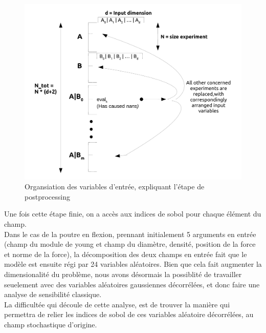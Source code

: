 \documentclass[a4paper,10pt]{article}
\begin{document}
\begin{figure}[H]
   \centering   
   \includegraphics[scale=0.175]{schema_postprocessing.png}
      \caption{Organsiation des variables d'entrée, expliquant l'étape de postprocessing}
         \label{posprocessing}
\end{figure}


Une fois cette étape finie, on a accès aux indices de sobol pour chaque élément du champ. \\
Dans le cas de la poutre en flexion, prennant initialement 5 arguments en entrée (champ du module de young et champ du diamètre, densité, position de la force et norme de la force), la décomposition des deux champs en entrée fait que le modèle est ensuite régi par 24 variables aléatoires. Bien que cela fait augmenter la dimensionalité du problème, nous avons désormais la possiblité de travailler seuelement avec des variables aléatoires gaussiennes décorrélées, et donc faire une analyse de sensibilité classique.\\
La difficultée qui découle de cette analyse, est de trouver la manière qui permettra de relier les indices de sobol de ces variables aléatoire décorrélées, au champ stochastique d'origine. \\
\end{document}
